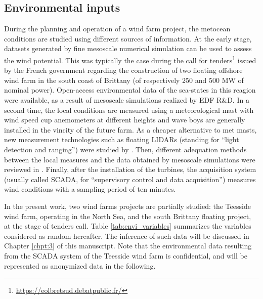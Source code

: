 \subsection{Environmental inputs}

During the planning and operation of a wind farm project, the metocean conditions are studied using different sources of information. 
At the early stage, datasets generated by fine mesoscale numerical simulation can be used to assess the wind potential. 
This was typically the case during the call for tenders\footnote{\url{https://eolbretsud.debatpublic.fr/}} issued by the French government regarding the construction of two floating offshore wind farm in the south coast of Brittany (of respectively 250 and 500 MW of nominal power). 
Open-access environmental data of the sea-states in this reagion were available, as a result of mesoscale simulations \citep{raoult_2018_anemoc3} realized by EDF R\&D.    
In a second time, the local conditions are measured using a meteorological mast with wind speed cup anemometers at different heights and wave boys are generally installed in the vincity of the future farm. 
As a cheaper alternative to met masts, new measurement technologies such as floating LIDARs (standing for ``light detection and ranging'') were studied by \citet{gottschall_2017_floating_LIDAR}. 
Then, different adequation methods between the local measures and the data obtained by mesoscale simulations were reviewed in \citet{sempreviva_2008_wind_assessment_review}.  
Finally, after the installation of the turbines, the acquisition system (usually called SCADA, for ``supervisory control and data acquisition'') measures wind conditions with a sampling period of ten minutes. 

In the present work, two wind farms projects are partially studied: the Teesside wind farm, operating in the North Sea, and the south Brittany floating project, at the stage of tenders call. 
Table \ref{tab:envi_variables} summarizes the variables considered as random hereafter. 
The inference of such data will be discussed in Chapter \ref{chpt:3} of this manuscript. 
Note that the environmental data resulting from the SCADA system of the Teesside wind farm is confidential, and will be represented as anonymized data in the following. 

